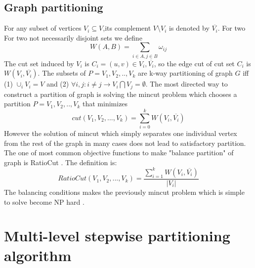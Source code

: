 \documentclass{acm_proc_article-sp}
\begin{document}
\subsection{Graph partitioning}
For any subset of vertices $V_{i} \subseteq V$,its complement $V \setminus V_{i}$ is denoted by $\overline{V_{i}}$. For two For two not necessarily disjoint sets we define
\begin{displaymath}
W(A,B)=\sum_{i\in A,j\in B}\omega_{ij}
\end{displaymath}
The cut set induced by $V_{i}$ is $C_{i}={(u,v)\in V_{i},\overline{V_{i}}}$, so the edge cut of cut set $C_{i}$ is $W(V_{i},\overline{V_{i}})$. The subsets of $P=V_{1},V_{2},..,V_{k}$ are k-way partitioning of graph $G$ iff (1) $\cup_{i}V_{i}=V$ and (2) $\forall i,j:i\neq j\rightarrow V_{i}\bigcap V_{j}=\emptyset$. The most directed way to construct a partition of graph is solving the mincut problem which chooses a partition  $P=V_{1},V_{2},..,V_{k}$ that minimizes
\begin{displaymath}
cut(V_{1},V_{2},...,V_{k})=\sum_{i=0}^{k}W(V_{i},\overline{V_{i}})
\end{displaymath}
However the solution of mincut which simply separates one individual vertex from the rest of the graph in many cases does not lead to satisfactory partition. The one of most common objective functions to make "balance partition" of graph is RatioCut \cite{w.hagen:new}. The definition is:
\begin{displaymath}
RatioCut(V_{1},V_{2},...,V_{k})=\frac{\sum_{i=1}^{k}W(V_{i},\overline{V_{i}})}{|V_{i}|}
\end{displaymath}
The balancing conditions makes the previously mincut problem which is simple to solve become NP hard \cite{wagner:mincut}.

\section{Multi-level stepwise partitioning algorithm}
\end{document}
